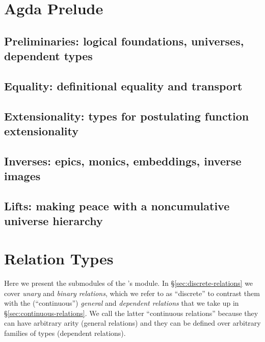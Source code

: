\documentclass[a4paper,UKenglish,cleveref,autoref,thm-restate,12pt]{../lipics-v2021-wjd}
\begin{document}
\section{Agda Prelude}\label{sec:agda-prelude}

\subsection{Preliminaries: logical foundations, universes, dependent types}\label{preliminaries}


\subsection{Equality: definitional equality and transport}\label{equality}


\subsection{Extensionality: types for postulating function extensionality}\label{function-extensionality}


\subsection{Inverses: epics, monics, embeddings, inverse images}\label{sec:inverse-image-invers}


\subsection{Lifts: making peace with a noncumulative universe hierarchy}\label{sec:lifts-altern-univ}


\section{Relation Types}\label{sec:relat-quot-types}
Here we present the submodules of the \agdaualib's  module. In \S\ref{sec:discrete-relations} we cover \emph{unary} and \emph{binary relations}, which we refer to as ``discrete'' to contrast them with the (``continuous'') \emph{general} and \emph{dependent relations} that we take up in \S\ref{sec:continuous-relations}. We call the latter ``continuous relations'' because they can have arbitrary arity (general relations) and they can be defined over arbitrary families of types (dependent relations).
\end{document}
